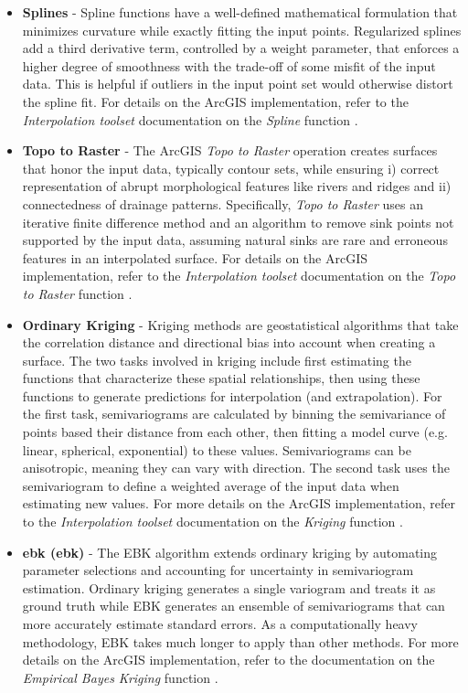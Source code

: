 \begin{itemize}
\item{\textbf{Splines}}\label{ch3:splines} - Spline functions have a well-defined mathematical formulation that minimizes curvature while exactly fitting the input points. Regularized splines add a third derivative term, controlled by a weight parameter, that enforces a higher degree of smoothness with the trade-off of some misfit of the input data. This is helpful if outliers in the input point set would otherwise distort the spline fit. For details on the ArcGIS implementation, refer to the \textit{Interpolation toolset} documentation on the \textit{Spline} function \citep{esri_spline_2021}.
\item{\textbf{Topo to Raster}}\label{ch3:topo2r} - The ArcGIS \textit{Topo to Raster} operation creates surfaces that honor the input data, typically contour sets, while ensuring i) correct representation of abrupt morphological features like rivers and ridges and ii) connectedness of drainage patterns. Specifically, \textit{Topo to Raster} uses an iterative finite difference method and an algorithm to remove sink points not supported by the input data, assuming natural sinks are rare and erroneous features in an interpolated surface. For details on the ArcGIS implementation, refer to the \textit{Interpolation toolset} documentation on the \textit{Topo to Raster} function \citep{esri_topo_2021}.
\item{\textbf{Ordinary Kriging}}\label{ch3:kriging} - Kriging methods are geostatistical algorithms that take the correlation distance and directional bias into account when creating a surface. The two tasks involved in kriging include first estimating the functions that characterize these spatial relationships, then using these functions to generate predictions for interpolation (and extrapolation). For the first task, semivariograms are calculated by binning the semivariance of points based their distance from each other, then fitting a model curve (e.g. linear, spherical, exponential) to these values. Semivariograms can be anisotropic, meaning they can vary with direction. The second task uses the semivariogram to define a weighted average of the input data when estimating new values. For more details on the ArcGIS implementation, refer to the \textit{Interpolation toolset} documentation on the \textit{Kriging} function \citep{esri_kriging_2021}.
\item{\textbf{\acrlong{ebk} (\acrshort{ebk})}}\label{ch3:ebk} - The EBK algorithm extends ordinary kriging by automating parameter selections and accounting for uncertainty in semivariogram estimation. Ordinary kriging generates a single variogram and treats it as ground truth while EBK generates an ensemble of semivariograms that can more accurately estimate standard errors. As a computationally heavy methodology, EBK takes much longer to apply than other methods. For more details on the ArcGIS implementation, refer to the documentation on the \textit{Empirical Bayes Kriging} function \citep{esri_empirical_2021}.
\end{itemize}

